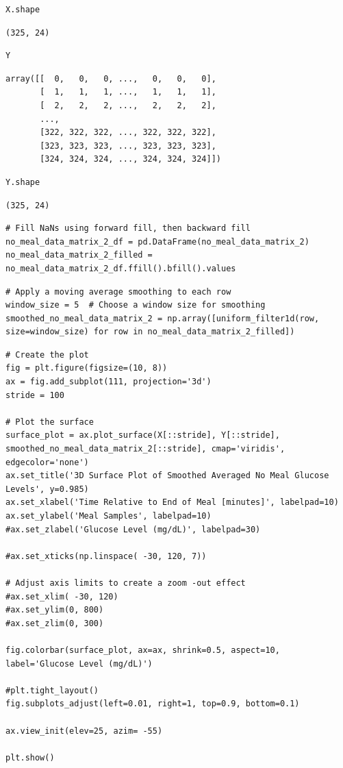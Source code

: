 \begin{verbatim}
X.shape
\end{verbatim}

\begin{verbatim}
(325, 24)
\end{verbatim}

\begin{verbatim}
Y
\end{verbatim}

\begin{verbatim}
array([[  0,   0,   0, ...,   0,   0,   0],
       [  1,   1,   1, ...,   1,   1,   1],
       [  2,   2,   2, ...,   2,   2,   2],
       ...,
       [322, 322, 322, ..., 322, 322, 322],
       [323, 323, 323, ..., 323, 323, 323],
       [324, 324, 324, ..., 324, 324, 324]])
\end{verbatim}

\begin{verbatim}
Y.shape
\end{verbatim}

\begin{verbatim}
(325, 24)
\end{verbatim}

\begin{verbatim}
# Fill NaNs using forward fill, then backward fill
no_meal_data_matrix_2_df = pd.DataFrame(no_meal_data_matrix_2)
no_meal_data_matrix_2_filled = no_meal_data_matrix_2_df.ffill().bfill().values
\end{verbatim}

\begin{verbatim}
# Apply a moving average smoothing to each row
window_size = 5  # Choose a window size for smoothing
smoothed_no_meal_data_matrix_2 = np.array([uniform_filter1d(row, size=window_size) for row in no_meal_data_matrix_2_filled])
\end{verbatim}

\begin{verbatim}
# Create the plot
fig = plt.figure(figsize=(10, 8))
ax = fig.add_subplot(111, projection='3d')
stride = 100

# Plot the surface
surface_plot = ax.plot_surface(X[::stride], Y[::stride], smoothed_no_meal_data_matrix_2[::stride], cmap='viridis', edgecolor='none')
ax.set_title('3D Surface Plot of Smoothed Averaged No Meal Glucose Levels', y=0.985)
ax.set_xlabel('Time Relative to End of Meal [minutes]', labelpad=10)
ax.set_ylabel('Meal Samples', labelpad=10)
#ax.set_zlabel('Glucose Level (mg/dL)', labelpad=30)

#ax.set_xticks(np.linspace( -30, 120, 7))

# Adjust axis limits to create a zoom -out effect
#ax.set_xlim( -30, 120)
#ax.set_ylim(0, 800)
#ax.set_zlim(0, 300)

fig.colorbar(surface_plot, ax=ax, shrink=0.5, aspect=10, label='Glucose Level (mg/dL)')

#plt.tight_layout()
fig.subplots_adjust(left=0.01, right=1, top=0.9, bottom=0.1)

ax.view_init(elev=25, azim= -55)

plt.show()
\end{verbatim}

